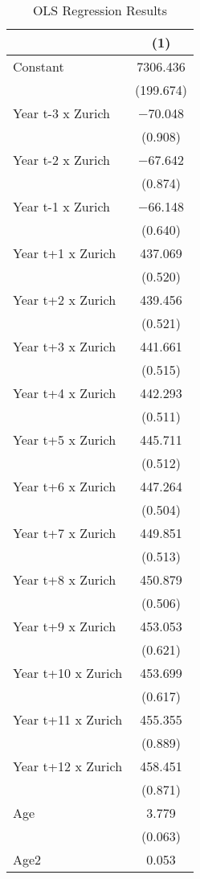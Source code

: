 \begin{table}

\caption{OLS Regression Results}
\centering
\begin{tabular}[t]{lc}
\toprule
  & (1)\\
\midrule
Constant & \num{7306.436}\\
 & (\num{199.674})\\
Year t-3 x Zurich & \num{-70.048}\\
 & (\num{0.908})\\
Year t-2 x Zurich & \num{-67.642}\\
 & (\num{0.874})\\
Year t-1 x Zurich & \num{-66.148}\\
 & (\num{0.640})\\
Year t+1 x Zurich & \num{437.069}\\
 & (\num{0.520})\\
Year t+2 x Zurich & \num{439.456}\\
 & (\num{0.521})\\
Year t+3 x Zurich & \num{441.661}\\
 & (\num{0.515})\\
Year t+4 x Zurich & \num{442.293}\\
 & (\num{0.511})\\
Year t+5 x Zurich & \num{445.711}\\
 & (\num{0.512})\\
Year t+6 x Zurich & \num{447.264}\\
 & (\num{0.504})\\
Year t+7 x Zurich & \num{449.851}\\
 & (\num{0.513})\\
Year t+8 x Zurich & \num{450.879}\\
 & (\num{0.506})\\
Year t+9 x Zurich & \num{453.053}\\
 & (\num{0.621})\\
Year t+10 x Zurich & \num{453.699}\\
 & (\num{0.617})\\
Year t+11 x Zurich & \num{455.355}\\
 & (\num{0.889})\\
Year t+12 x Zurich & \num{458.451}\\
 & (\num{0.871})\\
Age & \num{3.779}\\
 & (\num{0.063})\\
Age2 & \num{0.053}\\

\end{tabular}
\end{table}
